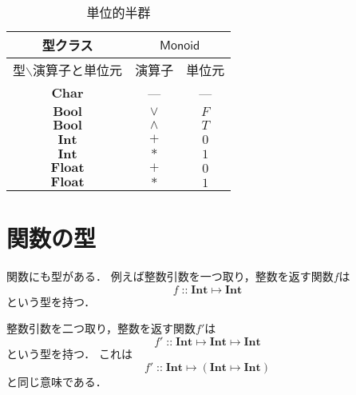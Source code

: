 \documentclass[twocolumn]{jsbook}
\newcommand{\hsklType}[1]{\textbf{#1}}
\newcommand{\hsklTypeclass}[1]{\mathsf{#1}}
\newcommand{\hsklBool}{\hsklType{Bool}}
\newcommand{\hsklInt}{\hsklType{Int}}
\newcommand{\hsklFloat}{\hsklType{Float}}
\newcommand{\hsklMonoid}{\hsklTypeclass{Monoid}}
\DeclareMathOperator{\mathIn}{::}
\DeclareMathOperator{\mathMapsTo}{\mapsto}
\newcommand{\mathMorph}[2]{#1\mathMapsTo#2}
\newcommand{\mathMorphII}[3]{#1\mathMapsTo#2\mathMapsTo#3}
\newcommand{\mathMorphIIWithParenthesis}[3]{#1\mathMapsTo(#2\mathMapsTo#3)}
\newcommand{\typename}[1]{\mathbf{#1}}
\newcommand{\typechar}{\typename{Char}}
\begin{document}
\begin{table}
\caption{単位的半群}
\label{tab:monoids}
\begin{center}
\begin{tabular}{||c||c|c||}
\hline
型クラス
    &\multicolumn{2}{|c||}{$\hsklMonoid$}\\
\hline\hline
型$\backslash$演算子と単位元
    &演算子
    &単位元\\
\hline
$\typechar$
    &---
    &---\\
\hline
$\hsklBool$
    &$\vee$
    &$F$\\
\hline
$\hsklBool$
    &$\wedge$
    &$T$\\
\hline
$\hsklInt$
    &$+$
    &$0$\\
\hline
$\hsklInt$
    &$*$
    &$1$\\
\hline
$\hsklFloat$
    &$+$
    &$0$\\
\hline
$\hsklFloat$
    &$*$
    &$1$\\
\hline
\end{tabular}
\end{center}
\end{table}

\section{関数の型}

関数にも型がある．
例えば整数引数を一つ取り，整数を返す関数$f$は$$f\mathIn\mathMorph{\hsklInt}{\hsklInt}$$という型を持つ．

整数引数を二つ取り，整数を返す関数$f'$は$$f'\mathIn\mathMorphII{\hsklInt}{\hsklInt}{\hsklInt}$$という型を持つ．
これは$$f'\mathIn\mathMorphIIWithParenthesis{\hsklInt}{\hsklInt}{\hsklInt}$$と同じ意味である．
\end{document}
